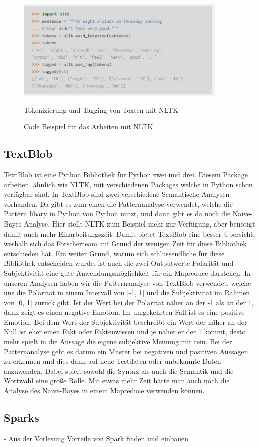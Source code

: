 	\begin{figure}[ht]
		\centering
		\includegraphics[width=0.9\textwidth]{images/Kapitel2/Code_Beispiel_2}
			\caption{\label{fig:CodeBeispiel}Code Beispiel für das Arbeiten mit NLTK}{Tokenizierung und Tagging von Texten mit NLTK}
	\end{figure}    	
		
	
	
	\subsection{TextBlob}
	
	TextBlob ist eine Python Bibliothek für Python zwei und drei. Diesem Package arbeiten, ähnlich wie NLTK, mit verschiedenen Packages welche in Python schon 
	verfügbar sind. In TextBlob sind zwei verschiedene Semantische Analysen vorhanden. Da gibt es zum einen die Patternanalyse verwendet, welche die Pattern 
	libary in Python von Python nutzt, und dann gibt es da noch die Naive-Bayes-Analyse.  Hier stellt NLTK zum Beispiel mehr zur Verfügung, aber 
	benötigt damit auch mehr Einarbeitungszeit. Damit bietet TextBlob eine besser Übersicht, weshalb sich das Forscherteam auf Grund der wenigen Zeit für 
	diese Bibliothek entschieden hat. Ein weiter Grund, warum sich schlussendliche für diese Bibliothek entscheiden wurde, ist auch die zwei Outputwerte 
	Polarität und Subjektivität eine gute Anwendungsmöglichkeit für ein Mapreduce darstellen. 	
	In unseren Analysen haben wir die Patternanalyse von TextBlob verwendet, welche uns die Polarität in einem Intervall von [-1, 1] und die Subjektivität im 
	Rahmen von [0, 1] zurück gibt. Ist der Wert bei der Polarität näher an der -1 als an der 1, dann zeigt es einen negative Emotion. Im umgekehrten Fall ist 
	es eine positive Emotion. Bei dem Wert der Subjektivität beschreibt ein Wert der näher an der Null ist eher einen Fakt oder Faktenwissen und je näher er 
	der 1 kommt, desto mehr spielt in die Aussage die eigene subjektive Meinung mit rein. 
	Bei der Patternanalyse geht es darum ein Muster bei negativen und positiven Aussagen zu erkennen und dies dann auf neue Testdaten oder unbekannte Daten 
	anzuwenden. Dabei spielt sowohl die Syntax als auch die Semantik und die Wortwahl eine große Rolle. 
	Mit etwas mehr Zeit hätte man auch noch die Analyse des Naive-Bayes in einem Mapreduce verwenden können.

	
	\subsection{Sparks}
	
	- Aus der Vorlesung Vorteile von Spark finden und einbauen	
	


	
